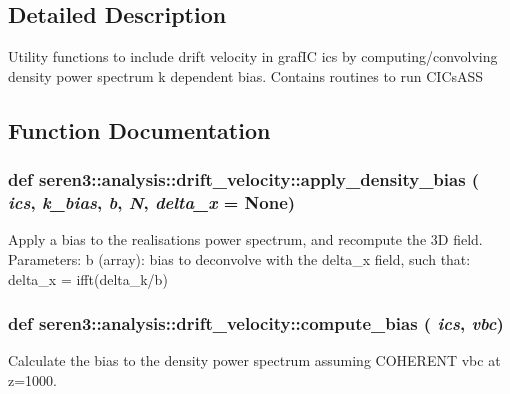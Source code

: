 \subsection{Detailed Description}
\begin{DoxyVerb}
Utility functions to include drift velocity in grafIC ics by computing/convolving density
power spectrum k dependent bias. Contains routines to run CICsASS
\end{DoxyVerb}
 

\subsection{Function Documentation}
\hypertarget{namespaceseren3_1_1analysis_1_1drift__velocity_ae09934064016aa37522bd7bcda3d1b63}{
\subsubsection[{apply\_\-density\_\-bias}]{\setlength{\rightskip}{0pt plus 5cm}def seren3::analysis::drift\_\-velocity::apply\_\-density\_\-bias ( {\em ics}, \/   {\em k\_\-bias}, \/   {\em b}, \/   {\em N}, \/   {\em delta\_\-x} = {\ttfamily None})}}
\label{namespaceseren3_1_1analysis_1_1drift__velocity_ae09934064016aa37522bd7bcda3d1b63}
\begin{DoxyVerb}Apply a bias to the realisations power spectrum, and recompute the 3D field.
Parameters:
    b (array): bias to deconvolve with the delta_x field, such that:
    delta_x = ifft(delta_k/b)
\end{DoxyVerb}
 \hypertarget{namespaceseren3_1_1analysis_1_1drift__velocity_a1af4a4187aeed3a597ca4c733d18993e}{
\subsubsection[{compute\_\-bias}]{\setlength{\rightskip}{0pt plus 5cm}def seren3::analysis::drift\_\-velocity::compute\_\-bias ( {\em ics}, \/   {\em vbc})}}
\label{namespaceseren3_1_1analysis_1_1drift__velocity_a1af4a4187aeed3a597ca4c733d18993e}
\begin{DoxyVerb}Calculate the bias to the density power spectrum assuming
COHERENT vbc at z=1000. \end{DoxyVerb}

